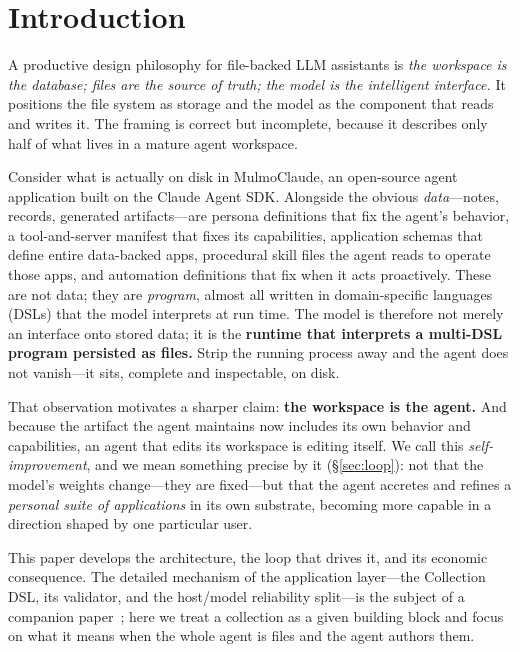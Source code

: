 \documentclass[11pt]{article}
\begin{document}
\section{Introduction}
\label{sec:intro}

A productive design philosophy for file-backed LLM assistants is \emph{the
workspace is the database; files are the source of truth; the model is the
intelligent interface.} It positions the file system as storage and the model as
the component that reads and writes it. The framing is correct but incomplete,
because it describes only half of what lives in a mature agent workspace.

Consider what is actually on disk in MulmoClaude, an open-source agent application
built on the Claude Agent SDK. Alongside the obvious \emph{data}---notes, records,
generated artifacts---are persona definitions that fix the agent's behavior, a
tool-and-server manifest that fixes its capabilities, application schemas that
define entire data-backed apps, procedural skill files the agent reads to operate
those apps, and automation definitions that fix when it acts proactively. These are
not data; they are \emph{program}, almost all written in domain-specific languages
(DSLs) that the model interprets at run time. The model is therefore not merely an
interface onto stored data; it is the \textbf{runtime that interprets a multi-DSL
program persisted as files.} Strip the running process away and the agent does not
vanish---it sits, complete and inspectable, on disk.

That observation motivates a sharper claim: \textbf{the workspace is the agent.}
And because the artifact the agent maintains now includes its own behavior and
capabilities, an agent that edits its workspace is editing itself. We call this
\emph{self-improvement}, and we mean something precise by it (\S\ref{sec:loop}): not
that the model's weights change---they are fixed---but that the agent accretes and
refines a \emph{personal suite of applications} in its own substrate, becoming more
capable in a direction shaped by one particular user.

This paper develops the architecture, the loop that drives it, and its economic
consequence. The detailed mechanism of the application layer---the Collection
DSL, its validator, and the host/model reliability split---is the subject of a
companion paper~\citep{nakajima2026dsl}; here we treat a collection as a given
building block and focus on what it means when the whole agent is files and the
agent authors them.
\end{document}
